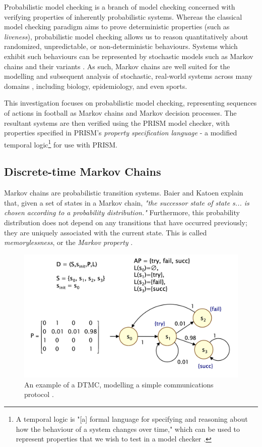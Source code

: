 \documentclass{l4proj}
\begin{document}
Probabilistic model checking is a branch of model checking concerned with verifying properties of inherently probabilistic systems. Whereas the classical model checking paradigm aims to prove deterministic properties (such as \textit{liveness}), probabilistic model checking allows us to reason quantitatively about randomized, unpredictable, or non-deterministic behaviours. Systems which exhibit such behaviours can be represented by stochastic models such as Markov chains and their variants \cite{hmbc2, pomc1, dpox1}. As such, Markov chains are well suited for the modelling and subsequent analysis of stochastic, real-world systems across  many domains \cite{hmbc2}, including biology, epidemiology, and even sports. 

This investigation focuses on probabilistic model checking, representing sequences of actions in football as Markov chains and Markov decision processes. The resultant systems are then verified using the PRISM model checker, with properties specified in PRISM's \textit{property specification language} - a modified temporal logic\footnote{A temporal logic is "[a] formal language for specifying and reasoning about how the behaviour of a system changes over time," which can be used to represent properties that we wish to test in a model checker \cite{dpox1}.} for use with PRISM.


\subsection{Discrete-time Markov Chains}

Markov chains are probabilistic transition systems. Baier and Katoen \cite{pomc1} explain that, given a set of states in a Markov chain, \textit{"the successor state of state \textit{s}... is chosen according to a probability distribution."} Furthermore, this probability distribution does not depend on any transitions that have occurred previously; they are uniquely associated with the current state. This is called \textit{memorylessness}, or the \textit{Markov property} \cite{pton1, dpox1}.

\begin{figure}[h]
    \centering
    \includegraphics[scale=0.4]{images/dtmcdiag1.png}   
    \caption{An example of a DTMC, modelling a simple communications protocol \cite{dpox1}.}
    \label{fig:dtmcdiag} 
\end{figure}
\end{document}
